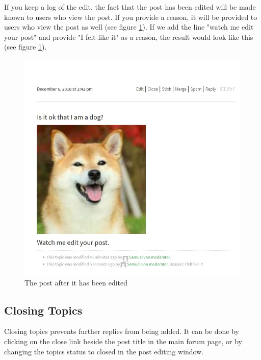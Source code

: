 \documentclass[10pt]{article}
\begin{document}
\begin{flushleft}
 If you keep a log of the edit, the fact that the post has been edited will be made known to users who view the post.  If you provide a reason, it will be provided to users who view the post as well (see figure \ref{post edited}). If we add the line "watch me edit your post" and provide "I felt like it" as a reason, the result would look like this (see figure \ref{post edited}). 
\end{flushleft}

\begin{figure}[H]
    \centering
    \includegraphics[scale=0.5]{images/postedited.jpg}
    \caption{The post after it has been edited}
    \label{post edited}
\end{figure}

\subsection{Closing Topics}

\begin{flushleft}
Closing topics prevents further replies from being added.  It can be done by clicking on the close link beside the post title in the main forum page, or by changing the topics status to closed in the post editing window.
\end{flushleft}
\end{document}
